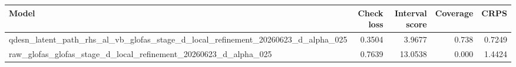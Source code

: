 \begin{tabular}{lrrrr}
\toprule
Model & Check loss & Interval score & Coverage & CRPS \\
\midrule
qdesn_latent_path_rhs_al_vb_glofas_stage_d_local_refinement_20260623_d_alpha_025 & 0.3504 & 3.9677 & 0.738 & 0.7249 \\
raw_glofas_glofas_stage_d_local_refinement_20260623_d_alpha_025 & 0.7639 & 13.0538 & 0.000 & 1.4424 \\
\bottomrule
\end{tabular}
